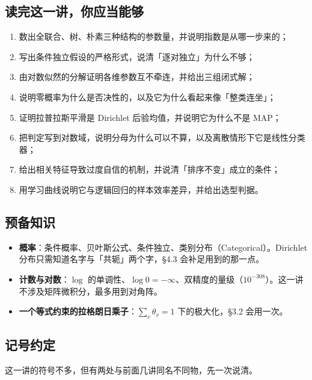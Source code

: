 \documentclass[11pt,a4paper,fontset=windows,zihao=-4]{ctexart}
\begin{document}
\subsection*{读完这一讲，你应当能够}

\begin{enumerate}[label=\textcolor{navy}{\bfseries\arabic*.},leftmargin=2.2em]
  \item 数出全联合、树、朴素三种结构的参数量，并说明指数是从哪一步来的；
  \item 写出条件独立假设的严格形式，说清「逐对独立」为什么不够；
  \item 由对数似然的分解证明各维参数互不牵连，并给出三组闭式解；
  \item 说明零概率为什么是否决性的，以及它为什么看起来像「整类连坐」；
  \item 证明拉普拉斯平滑是 Dirichlet 后验均值，并说明它为什么不是 MAP；
  \item 把判定写到对数域，说明分母为什么可以不算，以及离散情形下它是线性分类器；
  \item 给出相关特征导致过度自信的机制，并说清「排序不变」成立的条件；
  \item 用学习曲线说明它与逻辑回归的样本效率差异，并给出选型判据。
\end{enumerate}

\subsection*{预备知识}

\begin{itemize}
  \item \textbf{概率}：条件概率、贝叶斯公式、条件独立、类别分布（Categorical）。Dirichlet 分布只需知道名字与「共轭」两个字，§4.3 会补足用到的那一点。
  \item \textbf{计数与对数}：$\log$ 的单调性、$\log 0=-\infty$、双精度的量级（$10^{-308}$）。这一讲不涉及矩阵微积分，最多用到对角阵。
  \item \textbf{一个等式约束的拉格朗日乘子}：$\sum_v\theta_v=1$ 下的极大化，§3.2 会用一次。
\end{itemize}

\subsection*{记号约定}

这一讲的符号不多，但有两处与前面几讲同名不同物，先一次说清。
\end{document}
